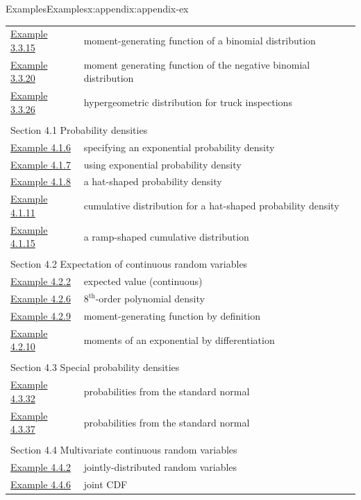 \documentclass[oneside,10pt,]{book}
\begin{document}
\begin{appendixptx}{Examples}{}{Examples}{}{}{x:appendix:appendix-ex}
\begin{longtable}[l]{ll}
\hyperref[x:example:ex-bin-mgf]{Example 3.3.15}& moment-generating function of a binomial distribution\\
\hyperref[x:example:ex-negbin-mgf]{Example 3.3.20}& moment generating function of the negative binomial distribution\\
\hyperref[x:example:ex-hyper]{Example 3.3.26}& hypergeometric distribution for truck inspections\\
\multicolumn{2}{l}{\null}\\[1.5ex] \multicolumn{2}{l}{\large Section 4.1 Probability densities}\\[0.5ex]
\hyperref[x:example:ex-exponential]{Example 4.1.6}& specifying an exponential probability density\\
\hyperref[x:example:ex-exponential2]{Example 4.1.7}& using exponential probability density\\
\hyperref[x:example:ex-hat]{Example 4.1.8}& a hat-shaped probability density\\
\hyperref[x:example:ex-hat-cdf]{Example 4.1.11}& cumulative distribution for a hat-shaped probability density\\
\hyperref[x:example:ex-F-to-f]{Example 4.1.15}& a ramp-shaped cumulative distribution\\
\multicolumn{2}{l}{\null}\\[1.5ex] \multicolumn{2}{l}{\large Section 4.2 Expectation of continuous random variables}\\[0.5ex]
\hyperref[x:example:ex-cont-exp]{Example 4.2.2}& expected value (continuous)\\
\hyperref[x:example:ex-poly]{Example 4.2.6}& \(8^{\text{th}}\)-order polynomial density\\
\hyperref[x:example:ex-exp-MGF]{Example 4.2.9}& moment-generating function by definition\\
\hyperref[x:example:ex-exp-mgf-by-diff]{Example 4.2.10}& moments of an exponential by differentiation\\
\multicolumn{2}{l}{\null}\\[1.5ex] \multicolumn{2}{l}{\large Section 4.3 Special probability densities}\\[0.5ex]
\hyperref[x:example:ex-std-norm-probs]{Example 4.3.32}& probabilities from the standard normal\\
\hyperref[x:example:ex-std-norm-probs2]{Example 4.3.37}& probabilities from the standard normal\\
\multicolumn{2}{l}{\null}\\[1.5ex] \multicolumn{2}{l}{\large Section 4.4 Multivariate continuous random variables}\\[0.5ex]
\hyperref[x:example:ex-joint]{Example 4.4.2}& jointly-distributed random variables\\
\hyperref[x:example:ex-joint-cdf]{Example 4.4.6}& joint CDF\\
\end{longtable}
\end{appendixptx}
\end{document}
